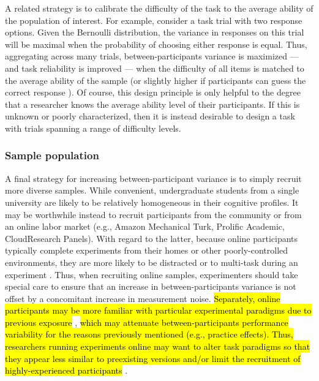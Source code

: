 \documentclass[a4paper,12pt]{article}
\begin{document}
A related strategy is to calibrate the difficulty of the task to the average ability of the population of interest. For example, consider a task trial with two response options. Given the Bernoulli distribution, the variance in responses on this trial will be maximal when the probability of choosing either response is equal. Thus, aggregating across many trials, between-participants variance is maximized --- and task reliability is improved --- when the difficulty of all items is matched to the average ability of the sample \cite{gulliksen1945relation} (or slightly higher if participants can guess the correct response \cite{lord1952relation, feldt1993relationship}). Of course, this design principle is only helpful to the degree that a researcher knows the average ability level of their participants. If this is unknown or poorly characterized, then it is instead desirable to design a task with trials spanning a range of difficulty levels. 

\subsubsection{Sample population}

A final strategy for increasing between-participant variance is to simply recruit more diverse samples. While convenient, undergraduate students from a single university are likely to be relatively homogeneous in their cognitive profiles. It may be worthwhile instead to recruit participants from the community or from an online labor market (e.g., Amazon Mechanical Turk, Prolific Academic, CloudResearch Panels). With regard to the latter, because online participants typically complete experiments from their homes or other poorly-controlled environments, they are more likely to be distracted or to multi-task during an experiment \cite{newman2021data}. Thus, when recruiting online samples, experimenters should take special care to ensure that an increase in between-participants variance is not offset by a concomitant increase in measurement noise. \hl{Separately, online participants may be more familiar with particular experimental paradigms due to previous exposure} \cite{chandler2014nonnaivete}, \hl{which may attenuate between-participants performance variability for the reasons previously mentioned (e.g., practice effects). Thus, researchers running experiments online may want to alter task paradigms so that they appear less similar to preexisting versions and/or limit the recruitment of highly-experienced participants} \cite{robinson2019tapped}. 
\end{document}
